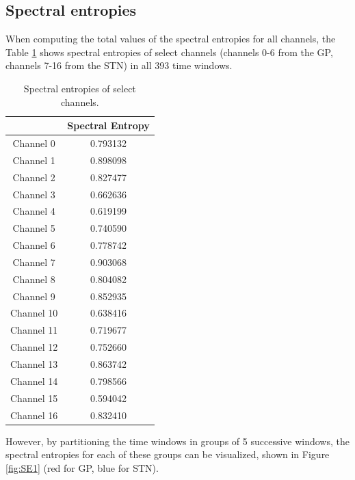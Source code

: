 \documentclass{kththesis}
\begin{document}
\subsection{Spectral entropies}

When computing the total values of the spectral entropies for all channels, the Table \ref{tab:spec_entr} shows spectral entropies of select channels (channels 0-6 from the GP, channels 7-16 from the STN) in all 393 time windows.

\begin{table}[H]
    \centering
    \begin{tabular}{|c|c|}
    \hline
                & Spectral Entropy \\ \hline
     Channel 0  & 0.793132         \\ \hline
     Channel 1  & 0.898098         \\ \hline
     Channel 2  & 0.827477         \\ \hline
     Channel 3  & 0.662636         \\ \hline
     Channel 4  & 0.619199         \\ \hline
     Channel 5  & 0.740590         \\ \hline
     Channel 6  & 0.778742         \\ \hline
     Channel 7  & 0.903068         \\ \hline
     Channel 8  & 0.804082         \\ \hline
     Channel 9  & 0.852935         \\ \hline
     Channel 10 & 0.638416         \\ \hline
     Channel 11 & 0.719677         \\ \hline
     Channel 12 & 0.752660         \\ \hline
     Channel 13 & 0.863742         \\ \hline
     Channel 14 & 0.798566         \\ \hline
     Channel 15 & 0.594042         \\ \hline
     Channel 16 & 0.832410         \\ \hline
    \end{tabular}
    \caption{Spectral entropies of select channels.}
    \label{tab:spec_entr}
\end{table}

However, by partitioning the time windows in groups of 5 successive windows, the spectral entropies for each of these groups can be visualized, shown in Figure \ref{fig:SE1} (red for GP, blue for STN).  
\end{document}
